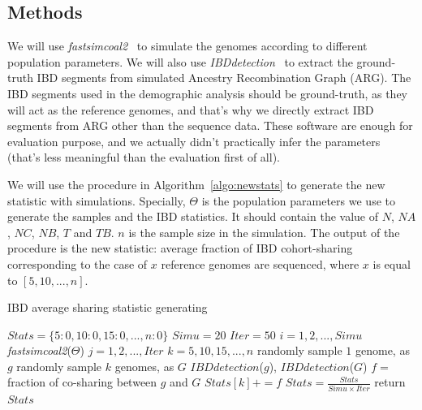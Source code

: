 \documentclass{bioinfo}
\begin{document}
\begin{methods}
\section{Methods}

We will use \textit{fastsimcoal2}~\cite{Excoffier2013} to simulate the genomes according to different population parameters. We will also use \textit{IBDdetection}~\cite{Yang2015} to extract the ground-truth IBD segments from simulated Ancestry Recombination Graph (ARG). The IBD segments used in the demographic analysis should be ground-truth, as they will act as the reference genomes, and that's why we directly extract IBD segments from ARG other than the sequence data. These software are enough for evaluation purpose, and we actually didn't practically infer the parameters (that's less meaningful than the evaluation first of all).

We will use the procedure in Algorithm~\ref{algo:newstats} to generate the new statistic with simulations. Specially, $\Theta$ is the population parameters we use to generate the samples and the IBD statistics. It should contain the value of $N$, $NA$, $NC$, $NB$, $T$ and $TB$. $n$ is the sample size in the simulation. The output of the procedure is the new statistic: average fraction of IBD cohort-sharing corresponding to the case of $x$ reference genomes are sequenced, where $x$ is equal to $[5,10,...,n]$.

\begin{algorithm}
\caption{IBD average sharing statistic generating}
\label{algo:newstats}
\vspace{-0.32cm}  %
\begin{codebox}
\li	$Stats=\{5:0, 10:0, 15:0, ... , n:0\}$
\li	$Simu=20$
\li	$Iter=50$
\li \For $i=1,2,...,Simu$
\li	\Do	\textit{fastsimcoal2}($\Theta$)
\li		\For $j=1,2,...,Iter$
\li		\Do \For $k=5,10,15,...,n$
\li			\Do randomly sample $1$ genome, as $g$
\li				randomly sample $k$ genomes, as $G$
\li				$IBDdetection$($g$), $IBDdetection$($G$)
\li				$f=$ fraction of co-sharing between $g$ and $G$
\li				$Stats[k]+=f$
			\End
		\End
	\End
\li	$Stats=\frac{Stats}{Simu \times Iter}$
\li	return $Stats$
\end{codebox}
\vspace{-0.35cm}  %
\end{algorithm}


\end{methods}
\end{document}
